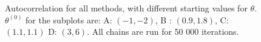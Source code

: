 \begin{figure}[ht]
    \caption{Autocorrelation for all methods, with different starting values for $\theta$. $\theta^{\left(0\right)}$ for the subplots are:   A: $(-1, -2)$, B : $(0.9, 1.8)$, C: $(1.1, 1.1)$ D: $(3, 6)$. All chains are run for 50 000 iterations.}%
    \label{fig:autocorrelation_50k_02_06}%
\end{figure}

